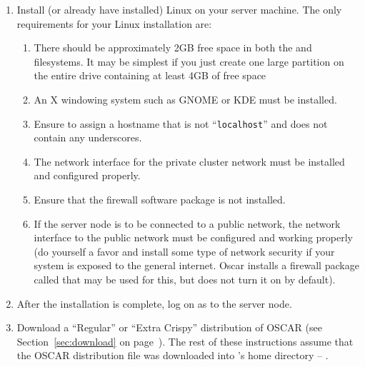 \begin {enumerate}
\item Install (or already have installed) Linux on your server
  machine.  The only requirements for your Linux installation are:

  \begin{enumerate}
  \item There should be approximately 2GB free space in both the
    \file{/} and  filesystems. It may be simplest if you
    just create one large partition on the entire drive containing at
    least 4GB of free space
    
  \item An X windowing system such as GNOME or KDE must be installed.

\begchange
    
  \item Ensure to assign a hostname that is not ``{\tt localhost}''
    and does not contain any underscores.
    
  \item The network interface for the private cluster network must be
    installed and configured properly.

  \item Ensure that the  firewall software package
    is not installed.
    
  \item If the server node is to be connected to a public network, the
    network interface to the public network must be configured and
    working properly (do yourself a favor and install some type of
    network security if your system is exposed to the general
    internet. Oscar installs a firewall package called
     that may be used for this, but does not turn it
    on by default).

\endchange

  \end{enumerate}
  
  
\item After the installation is complete, log on as  to the
  server node.
  
\item Download a ``Regular'' or ``Extra Crispy'' distribution of OSCAR
  (see Section~\ref{sec:download} on page~\pageref{sec:download}).
  The rest of these instructions assume that the OSCAR distribution
  file was downloaded into 's home directory --
  .


\end{enumerate}
